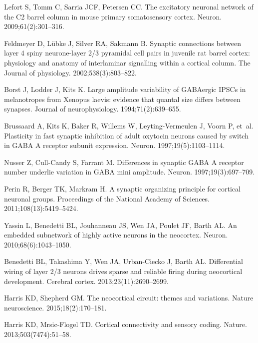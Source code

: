\documentclass[10pt,letterpaper]{article}
\begin{document}
\begin{thebibliography}{10}
Lefort S, Tomm C, Sarria JCF, Petersen CC.
\newblock The excitatory neuronal network of the C2 barrel column in mouse
  primary somatosensory cortex.
\newblock Neuron. 2009;61(2):301--316.

Feldmeyer D, L{\"u}bke J, Silver RA, Sakmann B.
\newblock Synaptic connections between layer 4 spiny neurone-layer 2/3
  pyramidal cell pairs in juvenile rat barrel cortex: physiology and anatomy of
  interlaminar signalling within a cortical column.
\newblock The Journal of physiology. 2002;538(3):803--822.

Borst J, Lodder J, Kits K.
\newblock Large amplitude variability of GABAergic IPSCs in melanotropes from
  Xenopus laevis: evidence that quantal size differs between synapses.
\newblock Journal of neurophysiology. 1994;71(2):639--655.

Brussaard A, Kits K, Baker R, Willems W, Leyting-Vermeulen J, Voorn P, et~al.
\newblock Plasticity in fast synaptic inhibition of adult oxytocin neurons
  caused by switch in GABA A receptor subunit expression.
\newblock Neuron. 1997;19(5):1103--1114.

Nusser Z, Cull-Candy S, Farrant M.
\newblock Differences in synaptic GABA A receptor number underlie variation in
  GABA mini amplitude.
\newblock Neuron. 1997;19(3):697--709.

Perin R, Berger TK, Markram H.
\newblock A synaptic organizing principle for cortical neuronal groups.
\newblock Proceedings of the National Academy of Sciences.
  2011;108(13):5419--5424.

Yassin L, Benedetti BL, Jouhanneau JS, Wen JA, Poulet JF, Barth AL.
\newblock An embedded subnetwork of highly active neurons in the neocortex.
\newblock Neuron. 2010;68(6):1043--1050.

Benedetti BL, Takashima Y, Wen JA, Urban-Ciecko J, Barth AL.
\newblock Differential wiring of layer 2/3 neurons drives sparse and reliable
  firing during neocortical development.
\newblock Cerebral cortex. 2013;23(11):2690--2699.

Harris KD, Shepherd GM.
\newblock The neocortical circuit: themes and variations.
\newblock Nature neuroscience. 2015;18(2):170--181.

Harris KD, Mrsic-Flogel TD.
\newblock Cortical connectivity and sensory coding.
\newblock Nature. 2013;503(7474):51--58.


\end{thebibliography}
\end{document}
